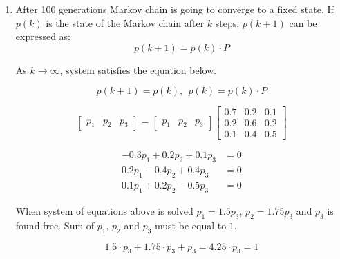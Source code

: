\documentclass[12pt,a4paper, margin=1in]{article}
\begin{document}
\begin{enumerate}[label=\textbf{\arabic*.}]
\begin{enumerate}
            \item 
                After 100 generations Markov chain is going to converge to a fixed state. If $p(k)$ is the state of the Markov chain after $k$ steps, $p(k+1)$ can be expressed as:
                \begin{equation*}
                    p(k+1) = p(k) \cdot P
                \end{equation*}

                As $k \rightarrow \infty$, system satisfies the equation below.

                \begin{equation*}
                    p(k+1) = p(k), \ \ p(k) = p(k) \cdot P
                \end{equation*}

                \begin{equation*}
                    \begin{bmatrix}
                        p_1 & p_2 & p_3
                    \end{bmatrix} = \begin{bmatrix}
                        p_1 & p_2 & p_3
                    \end{bmatrix} \begin{bmatrix}
                        0.7 & 0.2 & 0.1 \\
                        0.2 & 0.6 & 0.2 \\
                        0.1 & 0.4 & 0.5
                    \end{bmatrix}
                \end{equation*}

                \begin{align*}
                    -0.3p_1 + 0.2p_2 + 0.1p_3 &= 0 \\
                     0.2p_1 - 0.4p_2 + 0.4p_3 &= 0 \\
                     0.1p_1 + 0.2p_2 - 0.5p_3 &= 0
                \end{align*}

                When system of equations above is solved $p_1 = 1.5p_3$, $p_2 = 1.75p_3$ and $p_3$ is found free. 
                Sum of $p_1$, $p_2$ and $p_3$ must be equal to $1$.

                \begin{equation*}
                    1.5\cdot p_3 + 1.75 \cdot p_3 + p_3 = 4.25 \cdot p_3 = 1 
                \end{equation*}


\end{enumerate}
\end{enumerate}
\end{document}
